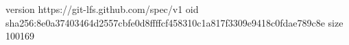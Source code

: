 version https://git-lfs.github.com/spec/v1
oid sha256:8e0a37403464d2557cbfe0d8ffffcf458310c1a817f3309e9418c0fdae789c8e
size 100169
